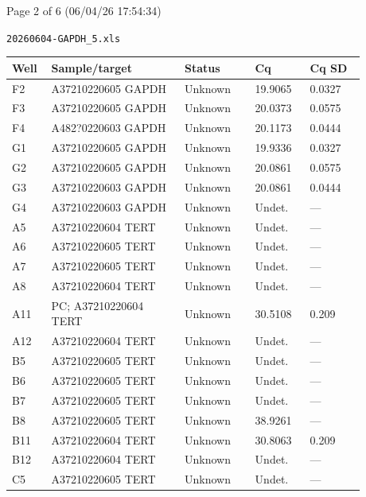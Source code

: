 \documentclass[UTF8,10pt,a4paper,fontset=fandol]{ctexart}
\begin{document}

\hfill Page 2 of 6 (06/04/26 17:54:34)

\hfill \texttt{20260604-GAPDH\_5.xls}

\newpage

\begin{center}
\small
\begin{tabular}{p{0.08\linewidth}p{0.34\linewidth}p{0.18\linewidth}p{0.14\linewidth}p{0.14\linewidth}}
\textbf{Well} & \textbf{Sample/target} & \textbf{Status} & \textbf{Cq} & \textbf{Cq SD} \\
\hline
F2  & A37210220605 GAPDH & Unknown & 19.9065 & 0.0327 \\
F3  & A37210220605 GAPDH & Unknown & 20.0373 & 0.0575 \\
F4  & A482?0220603 GAPDH & Unknown & 20.1173 & 0.0444 \\
G1  & A37210220605 GAPDH & Unknown & 19.9336 & 0.0327 \\
G2  & A37210220605 GAPDH & Unknown & 20.0861 & 0.0575 \\
G3  & A37210220603 GAPDH & Unknown & 20.0861 & 0.0444 \\
G4  & A37210220603 GAPDH & Unknown & Undet. & --- \\
A5  & A37210220604 TERT & Unknown & Undet. & --- \\
A6  & A37210220605 TERT & Unknown & Undet. & --- \\
A7  & A37210220605 TERT & Unknown & Undet. & --- \\
A8  & A37210220604 TERT & Unknown & Undet. & --- \\
A11 & PC; A37210220604 TERT & Unknown & 30.5108 & 0.209 \\
A12 & A37210220604 TERT & Unknown & Undet. & --- \\
B5  & A37210220605 TERT & Unknown & Undet. & --- \\
B6  & A37210220605 TERT & Unknown & Undet. & --- \\
B7  & A37210220605 TERT & Unknown & Undet. & --- \\
B8  & A37210220605 TERT & Unknown & 38.9261 & --- \\
B11 & A37210220604 TERT & Unknown & 30.8063 & 0.209 \\
B12 & A37210220604 TERT & Unknown & Undet. & --- \\
C5  & A37210220605 TERT & Unknown & Undet. & --- \\

\end{tabular}
\end{center}
\end{document}
